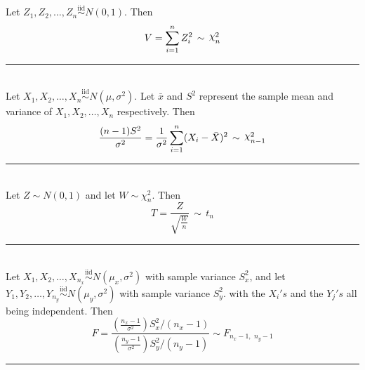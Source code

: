 \documentclass{article}
\newcommand{\HRule}{\rule{\linewidth}{0.25mm}}
\newcommand{\HRuleLight}{\rule{\linewidth}{0.1mm}}
\DeclareRobustCommand{\rchi}{{\mathpalette\irchi\relax}}
\newcommand{\irchi}[2]{\raisebox{\depth}{$#1\chi$}} %
\begin{document}
Let $Z_1, Z_2, \ldots, Z_n \overset{\text{iid}}{\sim} N(0, 1)$. Then
\begin{equation*}
	V = \sum_{i = 1}^{n} Z_{i}^2 \, \sim \, \rchi^2_{n}
\end{equation*}

\HRuleLight\\

Let $X_1, X_2, \ldots, X_n \overset{\text{iid}}{\sim} N(\mu, \sigma^2)$. 
Let $\bar{x}$ and $S^2$ represent the sample mean and variance of $X_1, X_2, \ldots, X_n$ respectively.
Then
\begin{equation*}
	\frac{(n-1)S^2}{\sigma^2}
	= \frac{1}{\sigma^2} \sum_{i = 1}^{n} (X_{i} - \bar{X})^2 \, \sim \, \rchi^2_{n-1}
\end{equation*}

\HRuleLight\\
Let $Z \sim N(0, 1)$ and let $W \sim \chi^2_{n}$. Then
\begin{equation*}
	T = \frac{Z}{ \displaystyle\sqrt{ \frac{W}{n}} }	\, \sim \,	t_{n}
\end{equation*}

\HRuleLight\\

%

Let $X_1, X_2, \ldots, X_{n_x} \overset{\text{iid}}{\sim} N(\mu_x, \sigma^2)$ with
sample variance $S^2_x$,
and
let $Y_1, Y_2, \ldots, Y_{n_y} \overset{\text{iid}}{\sim} N(\mu_y, \sigma^2)$ with
sample variance $S^2_y$.
with the $X_i's$ and the $Y_j's$ all being independent.
Then
\begin{equation*}
	F =
	\frac{ \left( \displaystyle\frac{n_x - 1}{\sigma^2} \right) S^2_x/(n_x - 1)}{ \left( \displaystyle\frac{n_y - 1}{\sigma^2} \right) S^2_y/(n_y - 1) } \sim F_{n_x-1, \,\, n_y-1}
\end{equation*}





\HRule
\end{document}
